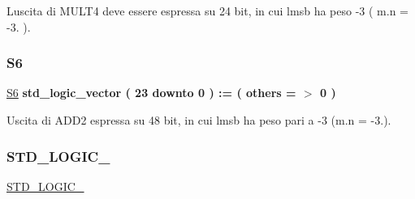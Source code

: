 L\textquotesingle{}uscita di M\+U\+L\+T4 deve essere espressa su 24 bit, in cui l\textquotesingle{}msb ha peso -\/3 ( m.\+n = -\/3. ). \mbox{\label{group___linear_regression_gaad1e5951d0d38888c5deafab1b89df1a}} 
\subsubsection{\texorpdfstring{S6}{S6}}
{\footnotesize\ttfamily \hyperlink{group___linear_regression_gaad1e5951d0d38888c5deafab1b89df1a}{S6} {\bfseries \textcolor{vhdlchar}{std\+\_\+logic\+\_\+vector}\textcolor{vhdlchar}{ }\textcolor{vhdlchar}{(}\textcolor{vhdlchar}{ }\textcolor{vhdlchar}{ } \textcolor{vhdldigit}{23} \textcolor{vhdlchar}{ }\textcolor{vhdlchar}{downto}\textcolor{vhdlchar}{ }\textcolor{vhdlchar}{ } \textcolor{vhdldigit}{0} \textcolor{vhdlchar}{ }\textcolor{vhdlchar}{)}\textcolor{vhdlchar}{ }\textcolor{vhdlchar}{ }\textcolor{vhdlchar}{ }\textcolor{vhdlchar}{\+:}\textcolor{vhdlchar}{=}\textcolor{vhdlchar}{ }\textcolor{vhdlchar}{(}\textcolor{vhdlchar}{ }\textcolor{vhdlchar}{ }\textcolor{vhdlchar}{others}\textcolor{vhdlchar}{ }\textcolor{vhdlchar}{ }\textcolor{vhdlchar}{=}\textcolor{vhdlchar}{ }\textcolor{vhdlchar}{$>$}\textcolor{vhdlchar}{ }\textcolor{vhdlchar}{\textquotesingle{}}\textcolor{vhdlchar}{ } \textcolor{vhdldigit}{0} \textcolor{vhdlchar}{ }\textcolor{vhdlchar}{\textquotesingle{}}\textcolor{vhdlchar}{ }\textcolor{vhdlchar}{)}\textcolor{vhdlchar}{ }} \hspace{0.3cm}{\ttfamily [Signal]}}

Uscita di A\+D\+D2 espressa su 48 bit, in cui l\textquotesingle{}msb ha peso pari a -\/3 (m.\+n = -\/3.). \mbox{\label{group___linear_regression_gaa4b2b25246a821511120e3149b003563}} 
\subsubsection{\texorpdfstring{S\+T\+D\+\_\+\+L\+O\+G\+I\+C\+\_}{STD\_LOGIC\_1164}}
{\footnotesize\ttfamily \hyperlink{group___linear_regression_gaa4b2b25246a821511120e3149b003563}{S\+T\+D\+\_\+\+L\+O\+G\+I\+C\+\_}\hspace{0.3cm}{\ttfamily [Package]}}

